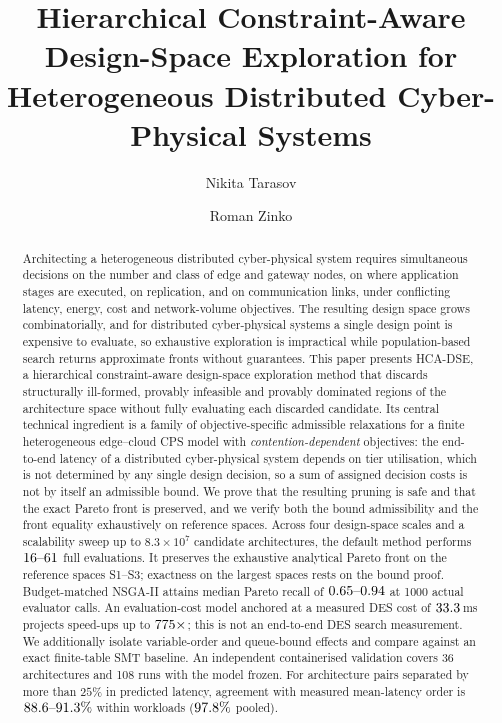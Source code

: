 \documentclass[preprint,11pt,3p]{elsarticle}
\theoremstyle{plain}
\theoremstyle{definition}
\begin{document}
\begin{frontmatter}

\title{Hierarchical Constraint-Aware Design-Space Exploration for\\
Heterogeneous Distributed Cyber-Physical Systems}

\author[lp]{Nikita Tarasov}
\author[lp]{Roman Zinko}
\address[lp]{Lviv Polytechnic National University, Lviv, Ukraine}

\begin{abstract}
Architecting a heterogeneous distributed cyber-physical system requires simultaneous
decisions on the number and class of edge and gateway nodes, on where application
stages are executed, on replication, and on communication links, under conflicting
latency, energy, cost and network-volume objectives. The resulting design space grows
combinatorially, and for distributed cyber-physical systems a single design point is
expensive to evaluate, so exhaustive exploration is impractical while population-based
search returns approximate fronts without guarantees. This paper presents HCA-DSE, a
hierarchical constraint-aware design-space exploration method that discards structurally
ill-formed, provably infeasible and provably dominated regions of the architecture space
without fully evaluating each discarded candidate. Its central technical ingredient is a
family of objective-specific admissible relaxations for a finite heterogeneous edge--cloud CPS model with \emph{contention-dependent} objectives: the
end-to-end latency of a distributed cyber-physical system depends on tier utilisation,
which is not determined by any single design decision, so a sum of assigned decision costs is not by itself an admissible bound. We prove that the resulting
pruning is safe and that the exact Pareto front is preserved, and we verify both the
bound admissibility and the front equality exhaustively on reference spaces. Across four design-space scales and a scalability sweep up to $8.3\times10^{7}$
candidate architectures, the default method performs $16\text{--}61$ full evaluations.
It preserves the exhaustive analytical Pareto front on the reference spaces S1--S3;
exactness on the largest spaces rests on the bound proof. Budget-matched NSGA-II attains
median Pareto recall of $0.65\text{--}0.94$ at 1000 actual evaluator calls.
An evaluation-cost model anchored at a measured DES cost of $33.3$\,ms projects
speed-ups up to $775\times$; this is not an end-to-end DES search measurement.
We additionally isolate variable-order and queue-bound effects and compare against an
exact finite-table SMT baseline. An independent containerised validation covers 36
architectures and 108 runs with the model frozen. For architecture pairs separated by
more than $25\%$ in predicted latency, agreement with measured mean-latency order is
$88.6\text{--}91.3\%$ within workloads ($97.8\%$ pooled).
\end{abstract}


\end{frontmatter}
\end{document}

